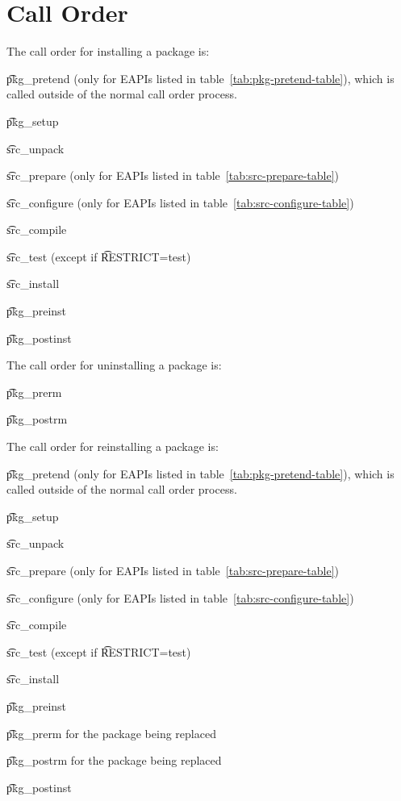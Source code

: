 \section{Call Order}

The call order for installing a package is:

\begin{compactitem}
\item \t{pkg\_pretend} (only for EAPIs listed in table~\ref{tab:pkg-pretend-table}), which is called
    outside of the normal call order process.
\item \t{pkg\_setup}
\item \t{src\_unpack}
\item \t{src\_prepare} (only for EAPIs listed in table~\ref{tab:src-prepare-table})
\item \t{src\_configure} (only for EAPIs listed in table~\ref{tab:src-configure-table})
\item \t{src\_compile}
\item \t{src\_test} (except if \t{RESTRICT=test})
\item \t{src\_install}
\item \t{pkg\_preinst}
\item \t{pkg\_postinst}
\end{compactitem}

The call order for uninstalling a package is:

\begin{compactitem}
\item \t{pkg\_prerm}
\item \t{pkg\_postrm}
\end{compactitem}

The call order for reinstalling a package is:

\begin{compactitem}
\item \t{pkg\_pretend} (only for EAPIs listed in table~\ref{tab:pkg-pretend-table}), which is called
    outside of the normal call order process.
\item \t{pkg\_setup}
\item \t{src\_unpack}
\item \t{src\_prepare} (only for EAPIs listed in table~\ref{tab:src-prepare-table})
\item \t{src\_configure} (only for EAPIs listed in table~\ref{tab:src-configure-table})
\item \t{src\_compile}
\item \t{src\_test} (except if \t{RESTRICT=test})
\item \t{src\_install}
\item \t{pkg\_preinst}
\item \t{pkg\_prerm} for the package being replaced
\item \t{pkg\_postrm} for the package being replaced
\item \t{pkg\_postinst}
\end{compactitem}

